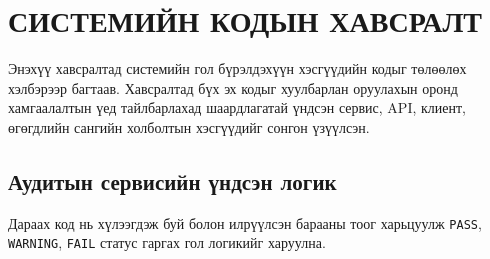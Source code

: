 \chapter{СИСТЕМИЙН КОДЫН ХАВСРАЛТ}

Энэхүү хавсралтад системийн гол бүрэлдэхүүн хэсгүүдийн кодыг төлөөлөх хэлбэрээр багтаав. Хавсралтад бүх эх кодыг хуулбарлан оруулахын оронд хамгаалалтын үед тайлбарлахад шаардлагатай үндсэн сервис, API, клиент, өгөгдлийн сангийн холболтын хэсгүүдийг сонгон үзүүлсэн.

\begingroup
\lstset{
    style=mystyle,
    basicstyle=\ttfamily\footnotesize,
    numbersep=6pt,
    aboveskip=6pt,
    belowskip=6pt
}

\section{Аудитын сервисийн үндсэн логик}

Дараах код нь хүлээгдэж буй болон илрүүлсэн барааны тоог харьцуулж \texttt{PASS}, \texttt{WARNING}, \texttt{FAIL} статус гаргах гол логикийг харуулна.

